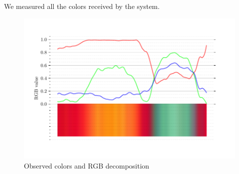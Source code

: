 \begin{minipage}{0.18\textwidth}
    \begin{figure}[h]
    \flushleft
    \vspace{-5mm}
    \end{figure}
\end{minipage}
\hfill
\begin{minipage}{0.8\textwidth}
We measured all the colors received by the system.
    \begin{figure}[h]
        \centering
        \includegraphics[width=1.1\textwidth]{figures/P1.pdf}
        \vspace{-14mm}
        \caption{Observed colors and RGB decomposition}
    \end{figure}
\end{minipage}